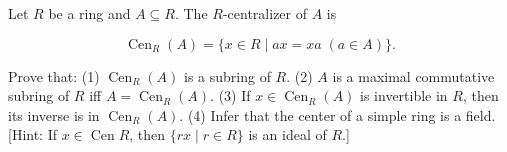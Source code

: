 Let $R$ be a ring and $A \subseteq R$. The $R$-centralizer of $A$ is

$$\operatorname{Cen}_R(A) = \{x \in R \mid ax = xa \; (a \in A)\}.$$

Prove that:
(1) $\operatorname{Cen}_R(A)$ is a subring of $R$.
(2) $A$ is a maximal commutative subring of $R$ iff $A = \operatorname{Cen}_R(A)$.
(3) If $x \in \operatorname{Cen}_R(A)$ is invertible in $R$, then its inverse is in $\operatorname{Cen}_R(A)$.
(4) Infer that the center of a simple ring is a field. [Hint: If $x \in \operatorname{Cen} R$, then $\{rx \mid r \in R\}$ is an ideal of $R$.]
